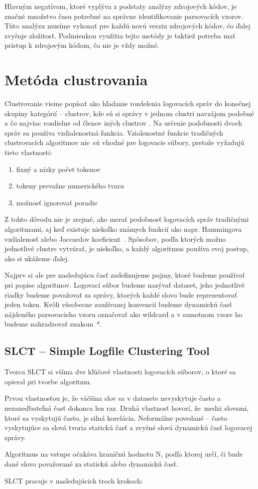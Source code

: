 Hlavným negatívom, ktoré vyplýva z podstaty analýzy zdrojových kódov, je značné množstvo času potrebné na správne identifikovanie parsovacích vzorov. Túto analýzu musíme vykonať pre každú novú verziu zdrojových kódov, čo ďalej zvyšuje zložitosť. Podmienkou využitia tejto metódy je taktiež potreba mať prístup k zdrojovým kódom, čo nie je vždy možné. 

\section{ Metóda clustrovania}

Clustrovanie vieme popísať ako hľadanie rozdelenia logovacích správ do konečnej skupiny kategórií -- clustrov, kde sú si správy v jednom clustri navzájom podobné a čo najviac rozdielne od členov iných clustrov  \parencite{iplom}. Na určenie podobnosti dvoch správ sa používa vzdialenostná funkcia. Vzialenostné funkcie tradičných clustrovacích algoritmov nie~sú vhodné pre logovacie súbory, pretože vyžadujú tieto vlastnosti:

\begin{enumerate}
  \item fixný a nízky počet tokenov
  \item tokeny prevažne numerického tvaru
  \item možnosť ignorovať poradie
\end{enumerate}

Z tohto dôvodu nie je zrejmé, ako merať podobnosť logovacích správ tradičnými algoritmami, aj keď existuje niekoľko známych funk\-cií ako napr. Hammingova vzdialenosť alebo Jaccardov koeficient~\parencite{slct}. Spôsobov, podľa ktorých možno jednotlivé clustre vytvárať, je niekoľko, a každý algoritmus používa svoj postup, ako si ukážeme ďalej. 
\par Najprv si ale pre nasledujúcu časť zadefinujeme pojmy, ktoré bude\-me používať pri popise algoritmov. Logovací súbor budeme nazývať dataset, jeho jednotlivé riadky budeme považovať za správy, ktorých každé slovo bude reprezentovať jeden token. Kvôli všeobecne zaužívanej konvencii budeme dynamickú časť nájdeného parsovacieho vzoru označovať ako wildcard a v samotnom vzore ho budeme nahra\-dzovať znakom \emph{*}.

\subsection{SLCT -- Simple Logfile Clustering Tool}
Tvorca SLCT \parencite{slct, slctloghound} si všíma dve kľúčové vlastnosti logovacích súborov, o ktoré sa opieral pri tvorbe algoritmu. \par Prvou vlastnosťou je, že väčšina slov sa v datasete nevyskytuje často a nezanedbateľná časť dokonca len raz. Druhá vlastnosť hovorí, že~medzi slovami, ktoré sa vyskytujú často, je silná korelácia. Neformál\-ne povedané -- často vyskytujúce sa slová tvoria statickú časť a zvyšné slová dynamickú časť logovacej správy. 
\par Algoritmus na vstupe očakáva hraničnú hodnotu N, podľa ktorej určí, či bude dané slovo považované za statickú alebo dynamickú časť. 
\par SLCT pracuje v nasledujúcich troch krokoch:

